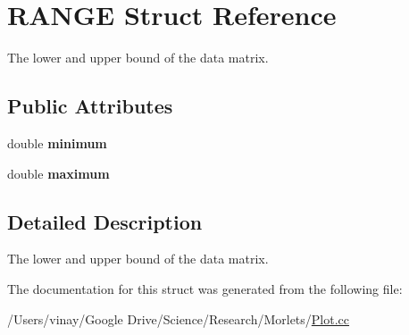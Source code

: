 \hypertarget{struct_r_a_n_g_e}{}\section{R\+A\+N\+G\+E Struct Reference}
\label{struct_r_a_n_g_e}


The lower and upper bound of the data matrix.  


\subsection*{Public Attributes}
\begin{DoxyCompactItemize}
\item 
\hypertarget{struct_r_a_n_g_e_a0581cee8c7a8c493e91c0d3435d26db9}{}double {\bfseries minimum}\label{struct_r_a_n_g_e_a0581cee8c7a8c493e91c0d3435d26db9}

\item 
\hypertarget{struct_r_a_n_g_e_a5fa7dd36152d33805f4dee7100ef2e5c}{}double {\bfseries maximum}\label{struct_r_a_n_g_e_a5fa7dd36152d33805f4dee7100ef2e5c}

\end{DoxyCompactItemize}


\subsection{Detailed Description}
The lower and upper bound of the data matrix. 

The documentation for this struct was generated from the following file\+:\begin{DoxyCompactItemize}
\item 
/\+Users/vinay/\+Google Drive/\+Science/\+Research/\+Morlets/\hyperlink{_plot_8cc}{Plot.\+cc}\end{DoxyCompactItemize}
